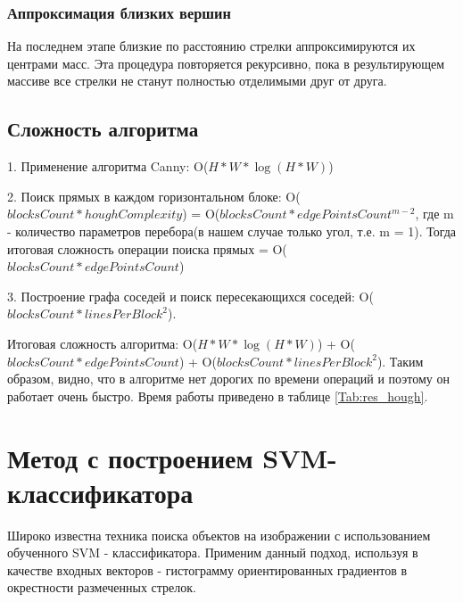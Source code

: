 \subsubsection{Аппроксимация близких вершин}
\label{approxi}
На последнем этапе близкие по расстоянию стрелки аппроксимируются их центрами масс.
Эта процедура повторяется рекурсивно, пока в результирующем массиве все стрелки не станут полностью отделимыми друг от друга.

\subsection{Сложность алгоритма}
1. Применение алгоритма Canny: O($H*W*\log(H*W)$)

2. Поиск прямых в каждом горизонтальном блоке: O($blocksCount * houghComplexity$) = O($blocksCount * edgePointsCount^{m-2}$, где m - количество параметров перебора(в нашем случае только угол, т.е. m = 1). Тогда итоговая сложность операции поиска прямых = O($blocksCount * edgePointsCount$)\newline

3. Построение графа соседей и поиск пересекающихся соседей: O($blocksCount * linesPerBlock^2$).

Итоговая сложность алгоритма: O($H*W*\log(H*W)$) + O($blocksCount * edgePointsCount$) + O($blocksCount * linesPerBlock^2$). Таким образом, видно, что в алгоритме нет дорогих по времени операций и поэтому он работает очень быстро. Время работы приведено в таблице \ref{Tab:res_hough}.


\section{Метод с построением SVM-классификатора}
\label{SVMClassifier}
Широко известна техника поиска объектов на изображении с использованием обученного SVM\cite{b:SVM} - классификатора. Применим данный подход, используя в качестве входных векторов - гистограмму ориентированных градиентов\cite{b:HOG} в окрестности размеченных стрелок. 
